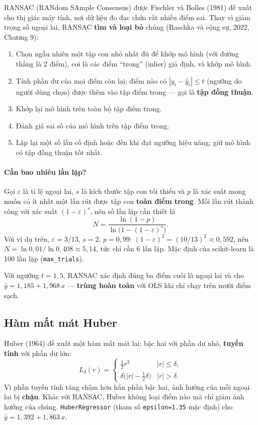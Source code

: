 RANSAC (RANdom SAmple Consensus) được Fischler và Bolles (1981) đề xuất cho thị giác máy tính, nơi dữ liệu đo đạc chứa rất nhiều điểm sai. Thay vì giảm trọng số ngoại lai, RANSAC \textbf{tìm và loại bỏ} chúng (Raschka và cộng sự, 2022, Chương 9):
\begin{enumerate}
    \item Chọn ngẫu nhiên một tập con nhỏ nhất đủ để khớp mô hình (với đường thẳng là 2 điểm), coi là các điểm ``trong'' (inlier) giả định, và khớp mô hình.
    \item Tính phần dư của mọi điểm còn lại; điểm nào có $|y_i - \hat{y}_i| \leq t$ (ngưỡng do người dùng chọn) được thêm vào tập điểm trong --- gọi là \textbf{tập đồng thuận}.
    \item Khớp lại mô hình trên toàn bộ tập điểm trong.
    \item Đánh giá sai số của mô hình trên tập điểm trong.
    \item Lặp lại một số lần cố định hoặc đến khi đạt ngưỡng hiệu năng; giữ mô hình có tập đồng thuận tốt nhất.
\end{enumerate}

\paragraph{Cần bao nhiêu lần lặp?} Gọi $\varepsilon$ là tỉ lệ ngoại lai, $s$ là kích thước tập con tối thiểu và $p$ là xác suất mong muốn có ít nhất một lần rút được tập con \textbf{toàn điểm trong}. Mỗi lần rút thành công với xác suất $(1 - \varepsilon)^s$, nên số lần lặp cần thiết là
\begin{equation}
    N = \frac{\ln(1 - p)}{\ln\big(1 - (1 - \varepsilon)^s\big)} .
\end{equation}
Với ví dụ trên, $\varepsilon = 3/13$, $s = 2$, $p = 0{,}99$: $(1 - \varepsilon)^2 = (10/13)^2 \approx 0{,}592$, nên $N = \ln 0{,}01 / \ln 0{,}408 \approx 5{,}14$, tức chỉ cần 6 lần lặp. Mặc định của scikit-learn là 100 lần lặp (\texttt{max\_trials}).

Với ngưỡng $t = 1{,}5$, RANSAC xác định đúng ba điểm cuối là ngoại lai và cho $\hat{y} = 1{,}185 + 1{,}968\,x$ --- \textbf{trùng hoàn toàn} với OLS khi chỉ chạy trên mười điểm sạch.

\subsection{Hàm mất mát Huber}

Huber (1964) đề xuất một hàm mất mát lai: bậc hai với phần dư nhỏ, \textbf{tuyến tính} với phần dư lớn:
\begin{equation}
    L_\delta(r) = \begin{cases} \tfrac{1}{2}r^2 & |r| \leq \delta, \\[3pt] \delta\big(|r| - \tfrac{1}{2}\delta\big) & |r| > \delta. \end{cases}
\end{equation}
Vì phần tuyến tính tăng chậm hơn hẳn phần bậc hai, ảnh hưởng của mỗi ngoại lai bị \textbf{chặn}. Khác với RANSAC, Huber không loại điểm nào mà chỉ giảm ảnh hưởng của chúng. \texttt{HuberRegressor} (tham số \texttt{epsilon=1.35} mặc định) cho $\hat{y} = 1{,}392 + 1{,}863\,x$.

